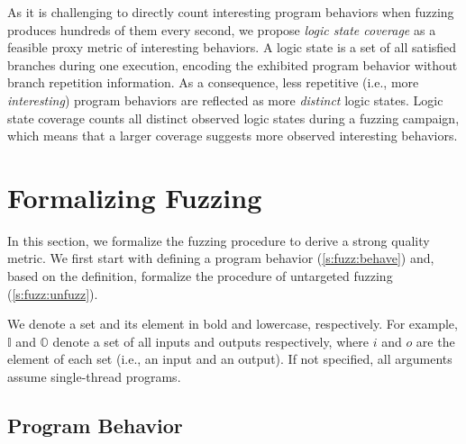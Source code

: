 \documentclass[letterpaper,twocolumn,10pt]{article}
\begin{document}
As it is challenging to directly count interesting program behaviors when
fuzzing produces hundreds of them every second, we propose \emph{logic state
coverage} as a feasible proxy metric of interesting behaviors. A logic state is
a set of all satisfied branches during one execution, encoding the
exhibited program behavior without branch repetition information.
As a consequence, less repetitive (i.e., more \emph{interesting}) program
behaviors are reflected as more \emph{distinct} logic states. Logic state
coverage counts all distinct observed logic states during a fuzzing campaign,
which means that a larger coverage suggests more observed interesting behaviors.



\section{Formalizing Fuzzing}

In this section, we formalize the fuzzing procedure to derive a strong quality
metric. We first start with defining a program
behavior (\autoref{s:fuzz:behave}) and, based on the definition, formalize the
procedure of untargeted fuzzing (\autoref{s:fuzz:unfuzz}).

%
We denote a set and its element in bold and lowercase, respectively.  For
example, $\mathbb{I}$ and $\mathbb{O}$ denote a set of all inputs and outputs
respectively, where $i$ and $o$ are the element of each set (i.e., an input and
an output). If not specified, all arguments assume single-thread programs.

\subsection{Program Behavior}
\label{s:fuzz:behave}

\end{document}
